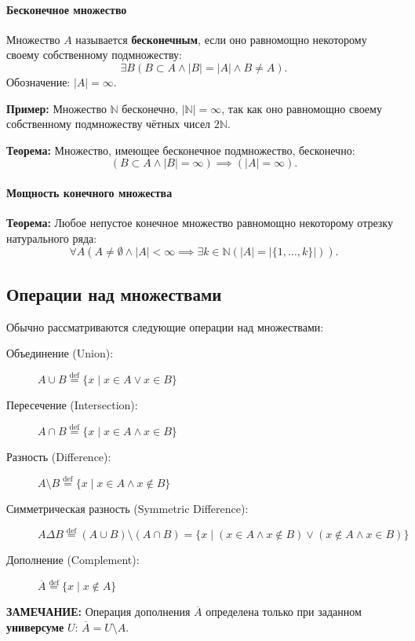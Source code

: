 \paragraph{Бесконечное множество}
Множество $A$ называется \textbf{бесконечным}, если оно равномощно некоторому своему собственному подмножеству:
$$\exists B (B \subset A \land |B| = |A| \land B \ne A).$$
Обозначение: $|A| = \infty$.

\textbf{Пример:} Множество $\mathbb{N}$ бесконечно, $|\mathbb{N}| = \infty$, так как оно равномощно своему собственному подмножеству чётных чисел $2\mathbb{N}$.

\textbf{Теорема:} Множество, имеющее бесконечное подмножество, бесконечно:
$$(B \subset A \land |B| = \infty) \implies (|A| = \infty).$$

\paragraph{Мощность конечного множества}
\textbf{Теорема:} Любое непустое конечное множество равномощно некоторому отрезку натурального ряда:
$$\forall A (A \ne \emptyset \land |A| < \infty \implies \exists k \in \mathbb{N} (|A| = |\{1, \ldots, k\}|)).$$

\subsection*{Операции над множествами}

Обычно рассматриваются следующие операции над множествами:

\begin{description}
    \item[Объединение (Union):] $A \cup B \stackrel{\text{def}}{=} \{x \mid x \in A \lor x \in B\}$
    \item[Пересечение (Intersection):] $A \cap B \stackrel{\text{def}}{=} \{x \mid x \in A \land x \in B\}$
    \item[Разность (Difference):] $A \setminus B \stackrel{\text{def}}{=} \{x \mid x \in A \land x \notin B\}$
    \item[Симметрическая разность (Symmetric Difference):]  $A \Delta B \stackrel{\text{def}}{=} (A \cup B) \setminus (A \cap B) = \{x \mid (x \in A \land x \notin B) \lor (x \notin A \land x \in B)\}$
    \item[Дополнение (Complement):] $\overline{A} \stackrel{\text{def}}{=} \{x \mid x \notin A\}$
\end{description}

\textbf{ЗАМЕЧАНИЕ:} Операция дополнения $\overline{A}$ определена только при заданном \textbf{универсуме} $U$: $\overline{A} = U \setminus A$.

